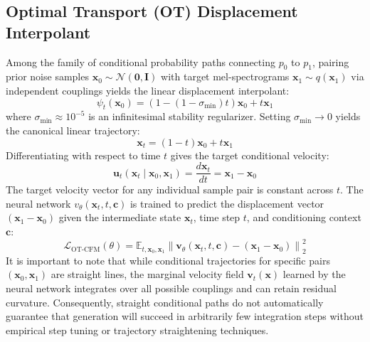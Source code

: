 \subsection{Optimal Transport (OT) Displacement Interpolant}
Among the family of conditional probability paths connecting $p_0$ to $p_1$, pairing prior noise samples $\mathbf{x}_0 \sim \mathcal{N}(\mathbf{0}, \mathbf{I})$ with target mel-spectrograms $\mathbf{x}_1 \sim q(\mathbf{x}_1)$ via independent couplings yields the linear displacement interpolant:
\begin{equation}
    \psi_t(\mathbf{x}_0) = (1 - (1 - \sigma_{\text{min}})t) \mathbf{x}_0 + t \mathbf{x}_1
    \label{eq:ot_displacement}
\end{equation}
where $\sigma_{\text{min}} \approx 10^{-5}$ is an infinitesimal stability regularizer. Setting $\sigma_{\text{min}} \to 0$ yields the canonical linear trajectory:
\begin{equation}
    \mathbf{x}_t = (1 - t)\mathbf{x}_0 + t \mathbf{x}_1
    \label{eq:linear_trajectory}
\end{equation}
Differentiating  with respect to time $t$ gives the target conditional velocity:
\begin{equation}
    \mathbf{u}_t(\mathbf{x}_t \mid \mathbf{x}_0, \mathbf{x}_1) = \frac{d\mathbf{x}_t}{dt} = \mathbf{x}_1 - \mathbf{x}_0
    \label{eq:ot_velocity}
\end{equation}
The target velocity vector for any individual sample pair is constant across $t$. The neural network $v_\theta(\mathbf{x}_t, t, \mathbf{c})$ is trained to predict the displacement vector $(\mathbf{x}_1 - \mathbf{x}_0)$ given the intermediate state $\mathbf{x}_t$, time step $t$, and conditioning context $\mathbf{c}$:
\begin{equation}
    \mathcal{L}_{\text{OT-CFM}}(\theta) = \mathbb{E}_{t, \mathbf{x}_0, \mathbf{x}_1} \left\| \mathbf{v}_\theta(\mathbf{x}_t, t, \mathbf{c}) - (\mathbf{x}_1 - \mathbf{x}_0) \right\|_2^2
    \label{eq:ot_cfm_loss}
\end{equation}
It is important to note that while conditional trajectories for specific pairs $(\mathbf{x}_0, \mathbf{x}_1)$ are straight lines, the marginal velocity field $\mathbf{v}_t(\mathbf{x})$ learned by the neural network integrates over all possible couplings and can retain residual curvature. Consequently, straight conditional paths do not automatically guarantee that generation will succeed in arbitrarily few integration steps without empirical step tuning or trajectory straightening techniques.

